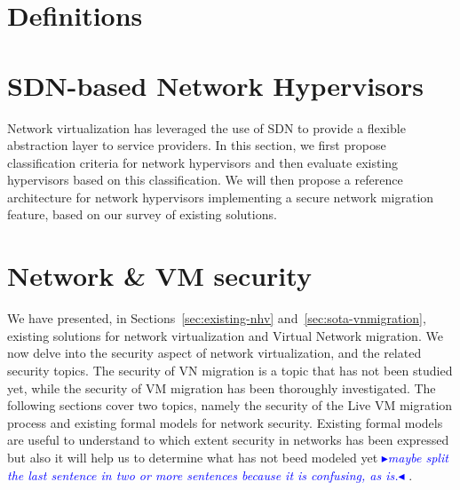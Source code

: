 \documentclass[a4paper, 11pt]{report}
\newcommand{\boxedtext}[1]{\fbox{\scriptsize\bfseries\textsf{#1}}}
\newcommand{\myremark}[2]{
   \textcolor{blue}{\boxedtext{#1}
      {\small$\blacktriangleright$\emph{\textsl{#2}}$\blacktriangleleft$}
}}
\newcommand\GB[1]{\myremark{GB}{#1}}
\theoremstyle{definition}
\begin{document}
\section{Definitions}
\label{sec:basic_def}


\section{SDN-based Network Hypervisors}

Network virtualization has leveraged the use of SDN to provide a flexible abstraction layer to service providers. In this section, we first propose classification criteria for network hypervisors and then evaluate existing hypervisors based on this classification. We will then propose a reference architecture for network hypervisors implementing a secure network migration feature, based on our survey of existing solutions.















\section{Network \& VM security}

We have presented, in Sections~\ref{sec:existing-nhv} and~\ref{sec:sota-vnmigration}, existing solutions for network virtualization and Virtual Network migration. We now delve into the security aspect of network virtualization, and the related security topics. The security of VN migration is a topic that has not been studied yet, while the security of VM migration has been thoroughly investigated. The following sections cover two topics, namely the security of the Live VM migration process and existing formal models for network security.
Existing formal models are useful to understand to which extent security in networks has been expressed but also it will help us to determine what has not beed modeled yet\GB{maybe split the last sentence in two or more sentences because it is confusing, as is.}.
\end{document}
